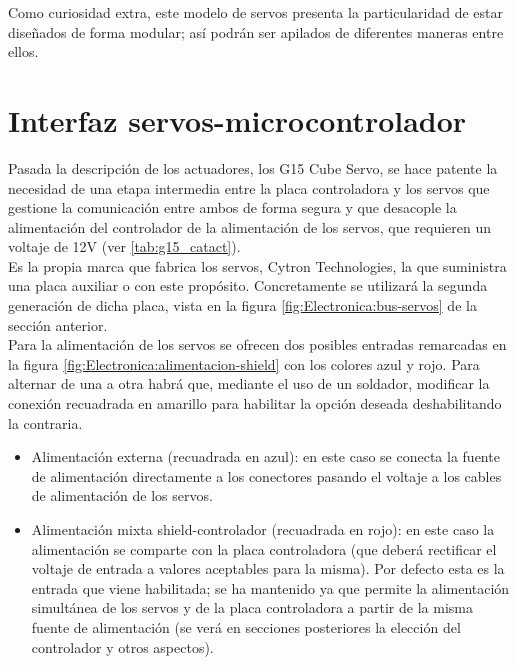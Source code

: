     Como curiosidad extra, este modelo de servos presenta la particularidad de estar diseñados de forma modular; así podrán ser apilados de diferentes maneras entre ellos.

\section{Interfaz servos-microcontrolador} \label{sec:Electronica:Potencia}

	Pasada la descripción de los actuadores, los G15 Cube Servo, se hace patente la necesidad de una etapa intermedia entre la placa controladora y los servos que gestione la comunicación entre ambos de forma segura y que desacople la alimentación del controlador de la alimentación de los servos, que requieren un voltaje de 12V (ver \ref{tab:g15_catact}).
	\\

	Es la propia marca que fabrica los servos, Cytron Technologies, la que suministra una placa auxiliar o  con este propósito. Concretamente se utilizará la segunda generación de dicha placa, vista en la figura \ref{fig:Electronica:bus-servos} de la sección anterior.
	\\

	Para la alimentación de los servos se ofrecen dos posibles entradas remarcadas en la figura \ref{fig:Electronica:alimentacion-shield} con los colores azul y rojo. Para alternar de una a otra habrá que, mediante el uso de un soldador, modificar la conexión recuadrada en amarillo para habilitar la opción deseada deshabilitando la contraria.
	\begin{itemize}
		\item Alimentación externa (recuadrada en azul): en este caso se conecta la fuente de alimentación directamente a los conectores pasando el voltaje a los cables de alimentación de los servos.
		\item Alimentación mixta shield-controlador (recuadrada en rojo): en este caso la alimentación se comparte con la placa controladora (que deberá rectificar el voltaje de entrada a valores aceptables para la misma). Por defecto esta es la entrada que viene habilitada; se ha mantenido ya que permite la alimentación simultánea de los servos y de la placa controladora a partir de la misma fuente de alimentación (se verá en secciones posteriores la elección del controlador y otros aspectos).
	\end{itemize}

